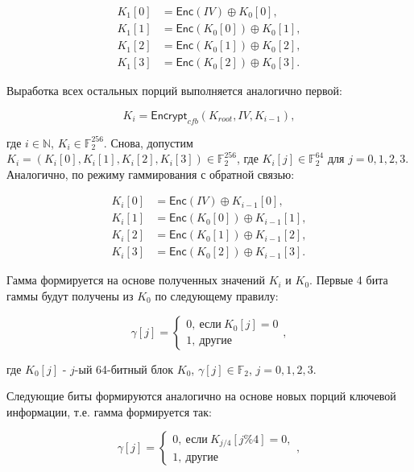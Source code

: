 \documentclass{article}
\newcommand{\FF}{\mathbb{F}}
\newcommand{\Enc}{\mathsf{Encrypt}}
\newcommand{\E}{\mathsf{Enc}}
\begin{document}
\begin{align*}
    K_1[0] & = \E(IV) \oplus K_0[0], \\
    K_1[1] & = \E(K_0[0]) \oplus K_0[1], \\
    K_1[2] & = \E(K_0[1]) \oplus K_0[2], \\
    K_1[3] & = \E(K_0[2]) \oplus K_0[3].
\end{align*}

Выработка всех остальных порций выполняется аналогично первой:

\begin{equation*}
    K_i = \Enc_{cfb}(K_{root}, IV, K_{i-1}),
\end{equation*}

\noindent где $i \in \mathbb{N}$, $K_i \in \FF_2^{256}$. Снова, допустим $K_i = (K_i[0], K_i[1], K_i[2], K_i[3]) \in \FF_2^{256}$, где $K_i[j] \in \FF_2^{64}$ для $j = 0, 1, 2, 3$. Аналогично, по режиму гаммирования с обратной связью:

\begin{align*}
    K_i[0] & = \E(IV) \oplus K_{i-1}[0], \\
    K_i[1] & = \E(K_0[0]) \oplus K_{i-1}[1], \\
    K_i[2] & = \E(K_0[1]) \oplus K_{i-1}[2], \\
    K_i[3] & = \E(K_0[2]) \oplus K_{i-1}[3].
\end{align*}

Гамма формируется на основе полученных значений $K_i$ и $K_0$. Первые 4 бита гаммы будут получены из $K_0$ по следующему правилу:

\begin{equation*}
    \gamma[j] = \begin{cases}
        0, \ \text{если} \ K_0[j] = 0 \\
        1, \ \text{другие}
    \end{cases},
\end{equation*}

\noindent где $K_0[j]$ - $j$-ый 64-битный блок $K_0$, $\gamma[j] \in \FF_2$, $j = 0, 1, 2, 3$.

Следующие биты формируются аналогично на основе новых порций ключевой информации, т.е. гамма формируется так:

\begin{equation*}
    \gamma[j] = \begin{cases}
        0, \ \text{если} \ K_{j / 4}[j \% 4] = 0, \\
        1, \ \text{другие}
    \end{cases},
\end{equation*}
\end{document}
